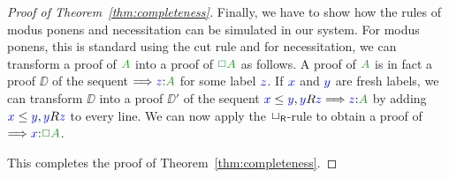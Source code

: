 \begin{proof}[Proof of Theorem~\ref{thm:completeness}]
  
  
  Finally, we have to show how the rules of modus ponens and
  necessitation can be simulated in our system. For modus ponens, this
  is standard using the cut rule and for necessitation, we can
  transform a proof of $\fm A$ into a proof of $\fm{\BOX A}$ as
  follows.
  A proof of $\fm A$ is in fact a proof $\DD$ of the sequent
  $\SEQ{\labels{z}{A}}$ for some label ${\color{blue}{z}}$. If ${\color{blue}{x}}$ and ${\color{blue}{y}}$
  are fresh labels, we can transform $\DD$ into a proof $\DD'$ of the
  sequent $\futs xy, \accs yz \SEQ \labels{z}{A}$ by adding ${\color{blue}{x}}\le{{\color{blue}{y}}},
  {\color{blue}{y}}R{\color{blue}{z}}$ to every line. We can now apply the $\mathsf{\mathord{\Box}}_{\mathsf{R}}$-rule to
  obtain a proof of $\SEQ \labels{x}{\BOX A}$.
  
%
%	
%	
%	
	
%	
%	
%	
%	
%	

  
  This completes the proof of Theorem~\ref{thm:completeness}.
\end{proof}


